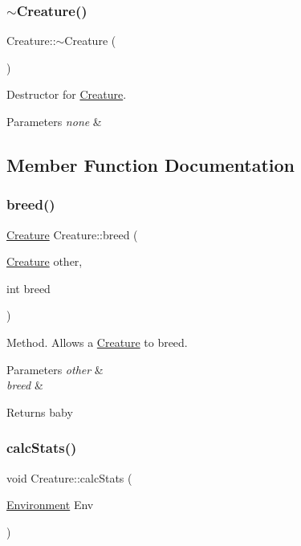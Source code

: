 \subsubsection{\texorpdfstring{$\sim$\+Creature()}{~Creature()}}
{\footnotesize\ttfamily Creature\+::$\sim$\+Creature (\begin{DoxyParamCaption}{ }\end{DoxyParamCaption})\hspace{0.3cm}{\ttfamily [virtual]}}

Destructor for \hyperlink{class_creature}{Creature}. 
\begin{DoxyParams}{Parameters}
{\em none} & \\
\hline
\end{DoxyParams}


\subsection{Member Function Documentation}
\mbox{\label{class_creature_aa3495553c53d7743c158d961827ec81f}} 
\subsubsection{\texorpdfstring{breed()}{breed()}}
{\footnotesize\ttfamily \hyperlink{class_creature}{Creature} Creature\+::breed (\begin{DoxyParamCaption}\item[{\hyperlink{class_creature}{Creature}}]{other,  }\item[{int}]{breed }\end{DoxyParamCaption})}

Method. Allows a \hyperlink{class_creature}{Creature} to breed. 
\begin{DoxyParams}{Parameters}
{\em other} & \\
\hline
{\em breed} & \\
\hline
\end{DoxyParams}
\begin{DoxyReturn}{Returns}
baby 
\end{DoxyReturn}
\mbox{\label{class_creature_a87624b71be563323455cb5241aba25b4}} 
\subsubsection{\texorpdfstring{calc\+Stats()}{calcStats()}}
{\footnotesize\ttfamily void Creature\+::calc\+Stats (\begin{DoxyParamCaption}\item[{\hyperlink{class_environment}{Environment}}]{Env }\end{DoxyParamCaption})}

